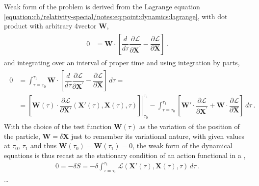 \documentclass[letterpaper,10pt,english]{jupyterBook}
\begin{document}
\sphinxAtStartPar
Weak form of the problem is derived from the Lagrange equation \eqref{equation:ch/relativity-special/notes:eq:point:dynamics:lagrange}, with dot product with arbitrary 4\sphinxhyphen{}vector \(\mathbf{W}\),
\begin{equation*}
\begin{split}\begin{aligned}
  0 
  & = \mathbf{W} \cdot \left[ \dfrac{d}{d\tau} \dfrac{\partial \mathscr{L}}{\partial \mathbf{X}^{'}} - \dfrac{\partial \mathscr{L}}{\partial \mathbf{X}} \right] \ .
\end{aligned}\end{split}
\end{equation*}
\sphinxAtStartPar
and integrating over an interval of proper time and using integration by parts,
\begin{equation*}
\begin{split}\begin{aligned}
  0 
  & = \int_{\tau = \tau_0}^{\tau_1} \mathbf{W} \cdot \left[ \dfrac{d}{d\tau} \dfrac{\partial \mathscr{L}}{\partial \mathbf{X}^{'}} - \dfrac{\partial \mathscr{L}}{\partial \mathbf{X}} \right] \, d \tau = \\
  & = \left.\left[ \mathbf{W}(\tau) \cdot \dfrac{\partial \mathscr{L}}{\partial \mathbf{X}'}(\mathbf{X}'(\tau), \mathbf{X}(\tau), \tau) \right]\right|_{\tau_0}^{\tau_1} - \int_{\tau = \tau_0}^{\tau_1} \left[ \mathbf{W}' \cdot \dfrac{\partial \mathscr{L}}{\partial \mathbf{X}^{'}} +  \mathbf{W} \cdot \dfrac{\partial \mathscr{L}}{\partial \mathbf{X}} \right] \, d \tau \ .
\end{aligned}\end{split}
\end{equation*}
\sphinxAtStartPar
With the choice of the test function \(\mathbf{W}(\tau)\) as the variation of the position of the particle, \(\mathbf{W} = \delta \mathbf{X}\) just to remember its variational nature, with given values at \(\tau_0\), \(\tau_1\) and thus \(\mathbf{W}(\tau_0) = \mathbf{W}(\tau_1) = 0\), the weak form of the dynamical equations is thus recast as the stationary condition of an action functional in a ,
\begin{equation*}
\begin{split}0 = - \delta S = - \delta \int_{\tau = \tau_0}^{\tau_1} \mathscr{L}\left(\mathbf{X}'(\tau), \mathbf{X}(\tau), \tau \right) \, d \tau \ .\end{split}
\end{equation*}
\sphinxAtStartPar
{} …
\end{document}

